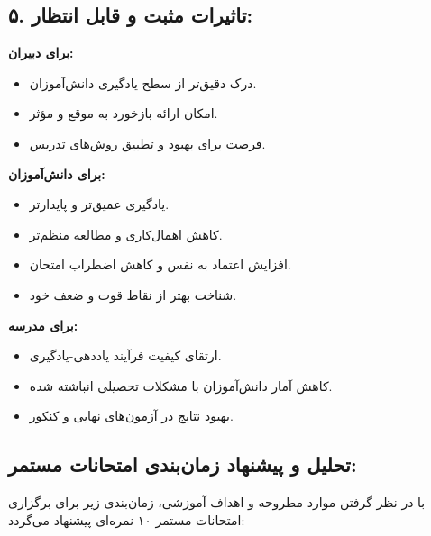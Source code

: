 \documentclass[a4paper,14pt]{article}
\begin{document}
\subsection*{۵. تاثیرات مثبت و قابل انتظار:}
\textbf{برای دبیران:}
\begin{itemize}
    \item درک دقیق‌تر از سطح یادگیری دانش‌آموزان.
    \item امکان ارائه بازخورد به موقع و مؤثر.
    \item فرصت برای بهبود و تطبیق روش‌های تدریس.
\end{itemize}
\textbf{برای دانش‌آموزان:}
\begin{itemize}
    \item یادگیری عمیق‌تر و پایدارتر.
    \item کاهش اهمال‌کاری و مطالعه منظم‌تر.
    \item افزایش اعتماد به نفس و کاهش اضطراب امتحان.
    \item شناخت بهتر از نقاط قوت و ضعف خود.
\end{itemize}
\textbf{برای مدرسه:}
\begin{itemize}
    \item ارتقای کیفیت فرآیند یاددهی-یادگیری.
    \item کاهش آمار دانش‌آموزان با مشکلات تحصیلی انباشته شده.
    \item بهبود نتایج در آزمون‌های نهایی و کنکور.
\end{itemize}
\bigskip
\subsection*{تحلیل و پیشنهاد زمان‌بندی امتحانات مستمر:}
\medskip
با در نظر گرفتن موارد مطروحه و اهداف آموزشی، زمان‌بندی زیر برای برگزاری امتحانات مستمر ۱۰ نمره‌ای پیشنهاد می‌گردد:
\medskip
\end{document}
